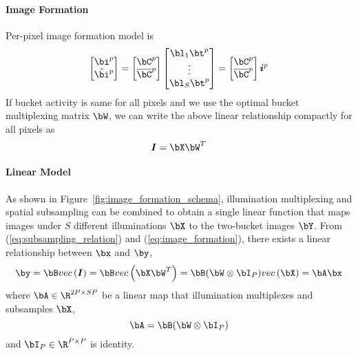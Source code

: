 \documentclass[../writeup.tex]{subfiles}
\begin{document}
\paragraph{Image Formation}
Per-pixel image formation model is
\[
    \begin{bmatrix}
        \bi^p \\ \hat{\bi}^p
    \end{bmatrix}
    = 
    \begin{bmatrix}
        \bC^p \\ \overline{\bC}^p
    \end{bmatrix}
    \begin{bmatrix}
        \bl_1 \bt^p \\ \vdots \\ \bl_S \bt^p
    \end{bmatrix}
    = 
    \begin{bmatrix}
        \bC^p \\ \overline{\bC}^p
    \end{bmatrix}
    \si^p
\]
If bucket activity is same for all pixels and we use the optimal bucket multiplexing matrix $\bW$, we can write the above linear relationship compactly for all pixels as
\begin{equation}
    \label{eq:image_formation}
    \sI = \bX \bW^T
\end{equation}

\paragraph{Linear Model} As shown in Figure~\ref{fig:image_formation_schema}, illumination multiplexing and spatial subsampling can be combined to obtain a single linear function that maps images under $S$ different illuminations $\bX$ to the two-bucket images $\bY$. From (\ref{eq:subsampling_relation}) and (\ref{eq:image_formation}), there exists a linear relationship between $\bx$ and $\by$, 
\begin{equation}
    \label{eq:linear_mapping}
    \by = \bB \vec{\sI} = \bB \vec{\bX \bW^T} = \bB(\bW \otimes \bI_P) \vec{\bX} = \bA\bx
\end{equation}
where $\bA \in \R^{2P\times SP}$ be a linear map that illumination multiplexes and subsamples $\bX$,
\[
    \bA = \bB(\bW\otimes \bI_P)
\]
and $\bI_P\in\R^{P\times P}$ is identity. 
\end{document}
